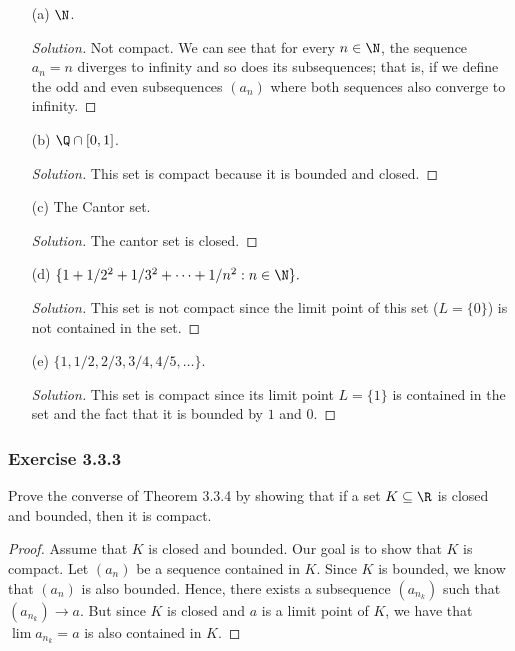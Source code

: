 \begin{enumerate}
    \item[(a)] \( \N \).
        \begin{proof}[Solution]
        Not compact. We can see that for every \( n \in \N \), the sequence \( a_n = n  \) diverges to infinity and so does its subsequences; that is, if we define the odd and even subsequences \( (a_n) \) where both sequences also converge to infinity.
        \end{proof}
    \item[(b)] \( \Q \cap [0,1] \).
        \begin{proof}[Solution]
        This set is compact because it is bounded and closed.
        \end{proof}
    \item[(c)] The Cantor set.
    \begin{proof}[Solution]
    The cantor set is closed.
    \end{proof}
\item[(d)] \( \{ 1 + 1/2^2 + 1/3^2 + \dots + 1/n^2 : n \in \N \}.  \)
    \begin{proof}[Solution]
    This set is not compact since the limit point of this set (\( L = \{ 0 \}  \)) is not contained in the set.
    \end{proof}
\item[(e)] \( \{ 1, 1/2, 2/3, 3/4, 4/5, \dots \}.  \)
    \begin{proof}[Solution]
        This set is compact since its limit point \( L = \{ 1 \}  \) is contained in the set and the fact that it is bounded by \( 1 \) and \( 0 \). 
    \end{proof}
\end{enumerate}


\subsubsection{Exercise 3.3.3} Prove the converse of Theorem 3.3.4 by showing that if a set \( K \subseteq \R \) is closed and bounded, then it is compact.

\begin{proof}
    Assume that \( K \) is closed and bounded. Our goal is to show that \( K \) is compact. Let \( (a_n) \) be a sequence contained in \( K \). Since \( K  \) is bounded, we know that \( (a_n) \) is also bounded. Hence, there exists a subsequence \( (a_{n_k}) \) such that \( (a_{n_k}) \to a \). But since \( K \) is closed and \( a \) is a limit point of \( K \), we have that \( \lim a_{n_k} = a  \) is also contained in \( K \).
\end{proof}


